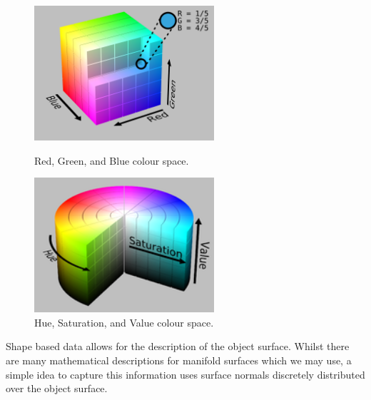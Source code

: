 \documentclass[a4paper]{article}
\begin{document}
\vspace{0.5cm}
 
\begin{figure}[h]
	\centering
	\begin{minipage}{0.45\textwidth}
		\centering
		\includegraphics[height=5cm]{RGB_colour_space}
		\caption{Red, Green, and Blue colour space.}
	\end{minipage}
	\hspace{1cm}
	\begin{minipage}{0.45\textwidth}
		\centering
		\includegraphics[height=5cm]{HSV_colour_space}
		\caption{Hue, Saturation, and Value colour space.}
	\end{minipage}
\end{figure}

Shape based data allows for the description of the object surface. Whilst there are many mathematical descriptions for manifold surfaces which we may use, a simple idea to capture this information uses surface normals discretely distributed over the object surface.
\end{document}
